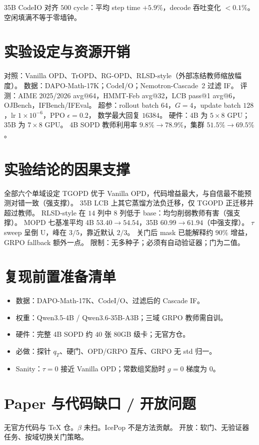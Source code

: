 \documentclass[11pt,a4paper]{ctexart}
\begin{document}
35B CodeIO 对齐 $500$ cycle：平均 step time $+5.9\%$，decode 吞吐变化 $<0.1\%$。
空闲填满不等于零墙钟。

\section{实验设定与资源开销}
对照：Vanilla OPD、TrOPD、RG-OPD、RLSD-style（外部冻结教师缩放幅度）。
数据：DAPO-Math-17K；CodeI/O；Nemotron-Cascade~2 过滤 IF。
评测：AIME 2025/2026 avg@64，HMMT-Feb avg@32，LCB pass@1 avg@6，OJBench，IFBench/IFEval。
超参：rollout batch $64$，$G=4$，update batch $128$，lr $1\times10^{-6}$，PPO $\epsilon=0.2$，
数学最大回复 $16384$。
硬件：4B 为 $5\times8$ GPU；35B 为 $7\times8$ GPU。
4B SOPD 教师利用率 $9.8\%\to78.9\%$，集群 $51.5\%\to69.5\%$。

\section{实验结论的因果支撑}
全部六个单域设定 TGOPD 优于 Vanilla OPD，代码增益最大，与自信最不能预测对错一致（强支撑）。
35B LCB 上其它蒸馏方法负迁移，仅 TGOPD 正迁移并超过教师。
RLSD-style 在 $14$ 列中 $8$ 列低于 base：均匀削弱教师有害（强支撑）。
MOPD 七基准平均 4B $53.40\to54.54$，35B $60.99\to61.94$（中强支撑）。
$\tau$ sweep 呈倒 U，峰在 $3/5$，靠近默认 $2/3$。
关门后 mask 已能解释约 $90\%$ 增益，GRPO fallback 额外一点。
限制：无多种子；必须有自动验证器；门为二值。

\section{复现前置准备清单}
\begin{itemize}
\item 数据：DAPO-Math-17K、CodeI/O、过滤后的 Cascade IF。
\item 权重：Qwen3.5-4B / Qwen3.6-35B-A3B；三域 GRPO 教师需自训。
\item 硬件：完整 4B SOPD 约 $40$ 张 $80$GB 级卡；无官方仓。
\item 必做：探针 $q_T$、硬门、OPD/GRPO 互斥、GRPO 无 std 归一。
\item Sanity：$\tau=0$ 接近 Vanilla OPD；常数组奖励时 $g=0$ 梯度为 $0$。
\end{itemize}

\section{Paper 与代码缺口 / 开放问题}
无官方代码与 TeX 仓。$\beta$ 未扫。IcePop 不是方法贡献。
开放：软门、无验证器任务、按域切换关门策略。
\end{document}
